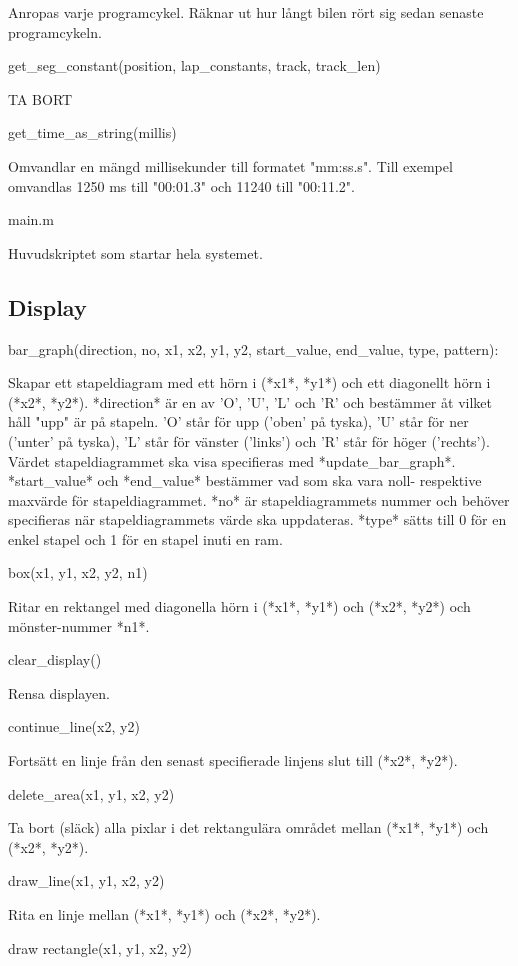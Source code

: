 \documentclass[10pt,oneside,swedish]{lips-no_customer}
\begin{document}
Anropas varje programcykel. Räknar ut hur långt bilen rört sig sedan senaste
programcykeln.

get\_seg\_constant(position, lap\_constants, track, track\_len)

TA BORT

get\_time\_as\_string(millis)

Omvandlar en mängd millisekunder till formatet "mm:ss.s". Till exempel omvandlas 1250
ms till "00:01.3" och 11240 till "00:11.2".

main.m

Huvudskriptet som startar hela systemet.

\subsection{Display}

bar\_graph(direction, no, x1, x2, y1, y2, start\_value, end\_value, type, pattern):

Skapar ett stapeldiagram med ett hörn i (*x1*, *y1*) och ett diagonellt
hörn i (*x2*, *y2*). *direction* är en av 'O', 'U', 'L' och 'R' och
bestämmer åt vilket håll "upp" är på stapeln. 'O' står för upp ('oben'
på tyska), 'U' står för ner ('unter' på tyska), 'L' står för vänster
('links') och 'R' står för höger ('rechts'). Värdet stapeldiagrammet ska
visa specifieras med *update\_bar\_graph*. *start\_value* och
*end\_value* bestämmer vad som ska vara noll- respektive maxvärde för
stapeldiagrammet. *no* är stapeldiagrammets nummer och behöver
specifieras när stapeldiagrammets värde ska uppdateras. *type* sätts
till 0 för en enkel stapel och 1 för en stapel inuti en ram.

box(x1, y1, x2, y2, n1)

Ritar en rektangel med diagonella hörn i (*x1*, *y1*) och (*x2*, *y2*)
och mönster-nummer *n1*.

clear\_display()

Rensa displayen.

continue\_line(x2, y2)

Fortsätt en linje från den senast specifierade linjens slut till (*x2*,
*y2*).

delete\_area(x1, y1, x2, y2)

Ta bort (släck) alla pixlar i det rektangulära området mellan (*x1*,
*y1*) och (*x2*, *y2*).

draw\_line(x1, y1, x2, y2)

Rita en linje mellan (*x1*, *y1*) och (*x2*, *y2*).

draw rectangle(x1, y1, x2, y2)
\end{document}
